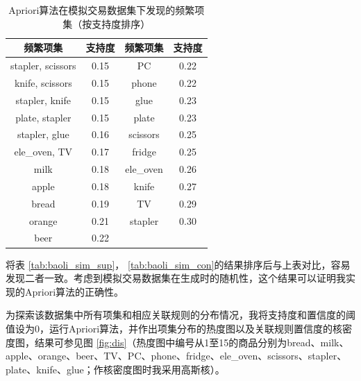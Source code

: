 \documentclass[12pt,a4paper]{article}
\theoremstyle{definition}
\begin{document}
\begin{table}[H]
	\renewcommand\arraystretch{1.35}
	\caption{Apriori算法在模拟交易数据集下发现的频繁项集（按支持度排序）}
	\label{tab:apriori_sim_sup}
	\centering
	
	\begin{tabular}{c|c|c|c}
		\centering
		频繁项集 & 支持度 & 频繁项集 & 支持度 \\
		\hline
		stapler, scissors & 0.15 & PC & 0.22 \\
		knife, scissors & 0.15 & phone & 0.22 \\
		stapler, knife & 0.15 & glue & 0.23 \\
		plate, stapler & 0.15 &plate & 0.23 \\
		stapler, glue & 0.16 & scissors & 0.25 \\
		ele\_oven, TV & 0.17 & fridge & 0.25 \\
		milk & 0.18 & ele\_oven & 0.26 \\
		apple & 0.18 & knife & 0.27 \\
		bread & 0.19 & TV & 0.29 \\
		orange & 0.21 & stapler & 0.30 \\
		beer & 0.22 & & \\		
	\end{tabular}
\end{table}

\vspace{0.005\linewidth}
将表 \ref{tab:baoli_sim_sup}， \ref{tab:baoli_sim_con}的结果排序后与上表对比，容易发现二者一致。考虑到模拟交易数据集在生成时的随机性，这个结果可以证明我实现的Apriori算法的正确性。

\vspace{0.01\linewidth}
为探索该数据集中所有项集和相应关联规则的分布情况，我将支持度和置信度的阈值设为0，运行Apriori算法，并作出项集分布的热度图以及关联规则置信度的核密度图，结果可参见图 \ref{fig:dis}（热度图中编号从1至15的商品分别为bread、milk、apple、orange、beer、TV、PC、phone、fridge、ele\_oven、scissors、stapler、plate、knife、glue；作核密度图时我采用高斯核）。
\end{document}

